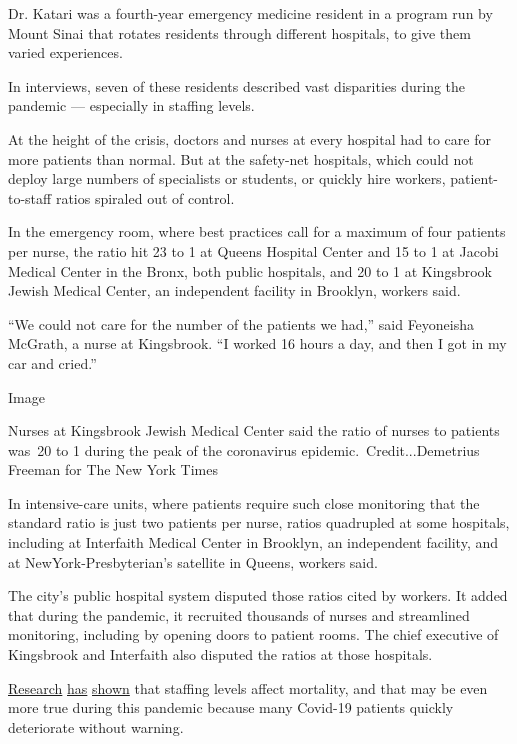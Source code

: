 Dr. Katari was a fourth-year emergency medicine resident in a program
run by Mount Sinai that rotates residents through different hospitals,
to give them varied experiences.

In interviews, seven of these residents described vast disparities
during the pandemic --- especially in staffing levels.

At the height of the crisis, doctors and nurses at every hospital had to
care for more patients than normal. But at the safety-net hospitals,
which could not deploy large numbers of specialists or students, or
quickly hire workers, patient-to-staff ratios spiraled out of control.

In the emergency room, where best practices call for a maximum of four
patients per nurse, the ratio hit 23 to 1 at Queens Hospital Center and
15 to 1 at Jacobi Medical Center in the Bronx, both public hospitals,
and 20 to 1 at Kingsbrook Jewish Medical Center, an independent facility
in Brooklyn, workers said.

``We could not care for the number of the patients we had,'' said
Feyoneisha McGrath, a nurse at Kingsbrook. ``I worked 16 hours a day,
and then I got in my car and cried.''

Image

Nurses at Kingsbrook Jewish Medical Center said the ratio of nurses to
patients was~20 to 1 during the peak of the coronavirus
epidemic.~Credit...Demetrius Freeman for The New York Times

In intensive-care units, where patients require such close monitoring
that the standard ratio is just two patients per nurse, ratios
quadrupled at some hospitals, including at Interfaith Medical Center in
Brooklyn, an independent facility, and at NewYork-Presbyterian's
satellite in Queens, workers said.

The city's public hospital system disputed those ratios cited by
workers. It added that during the pandemic, it recruited thousands of
nurses and streamlined monitoring, including by opening doors to patient
rooms. The chief executive of Kingsbrook and Interfaith also disputed
the ratios at those hospitals.

\href{https://www.ncbi.nlm.nih.gov/pubmed/29110907}{Research}
\href{https://psnet.ahrq.gov/primer/nursing-and-patient-safety}{has}
\href{https://patientengagementhit.com/news/how-nurse-staffing-ratios-impact-patient-safety-access-to-care}{shown}
that staffing levels affect mortality, and that may be even more true
during this pandemic because many Covid-19 patients quickly deteriorate
without warning.

